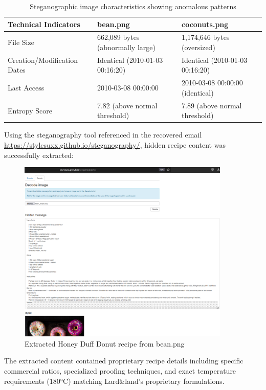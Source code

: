 \begin{table}[htbp]
\centering
\small
\begin{tabular}{|p{4cm}|p{5.5cm}|p{5.5cm}|}
\hline
\textbf{Technical Indicators} & \textbf{bean.png} & \textbf{coconuts.png} \\
\hline
File Size & 662,089 bytes (abnormally large) & 1,174,646 bytes (oversized) \\
\hline
Creation/Modification Dates & Identical (2010-01-03 00:16:20) & Identical (2010-01-03 00:16:20) \\
\hline
Last Access & 2010-03-08 00:00:00 & 2010-03-08 00:00:00 (identical) \\
\hline
Entropy Score & 7.82 (above normal threshold) & 7.89 (above normal threshold) \\
\hline
\end{tabular}
\caption{Steganographic image characteristics showing anomalous patterns}
\label{table:steg_comparison}
\end{table}

Using the steganography tool referenced in the recovered email \url{https://stylesuxx.github.io/steganography/}, hidden recipe content was successfully extracted:

\begin{figure}[htbp]
    \centering
    \includegraphics[width=0.9\textwidth]{images/Artifact and Evidence Recovery/bean_extract.png}
    \caption{Extracted Honey Duff Donut recipe from bean.png}
    \label{fig:extracted_recipe}
\end{figure}

The extracted content contained proprietary recipe details including specific commercial ratios, specialized proofing techniques, and exact temperature requirements (180°C) matching Lard\&land's proprietary formulations.


